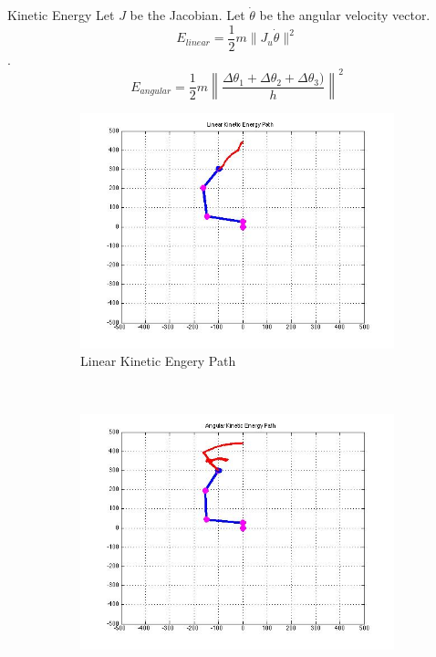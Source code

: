 \documentclass{beamer}
\begin{document}
\begin{frame}{Kinetic Energy}
Let $J$ be the Jacobian. Let $\dot{\theta}$ be the angular velocity vector.
 \small\[E_{linear} = \frac{1}{2}m \|J_u\dot{\theta}\|^2\]. \\
\[E_{angular} = \frac{1}{2}m \left\|\frac{\Delta\theta_1+\Delta\theta_2+\Delta\theta_3)}{h}\right\|^2\]\normalsize
\begin{figure}[htb]
\centering
\begin{subfigure}[b]{0.33\textwidth}
\centering
\includegraphics[scale=.135]{PathPics/Energy_Linear_Path.jpg}
\caption{Linear Kinetic Engery Path}
\end{subfigure}%
~ 
\begin{subfigure}[b]{0.33\textwidth}
\centering
\includegraphics[scale=.135]{PathPics/Energy_Angular_Path.jpg}

\end{subfigure}
\end{figure}
\end{frame}
\end{document}
